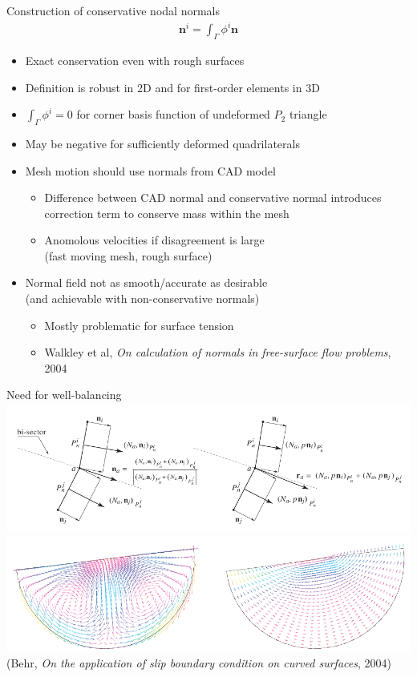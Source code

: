 \begin{frame}{Construction of conservative nodal normals}
  \begin{gather*}
    \bm n^i = \int_\Gamma \phi^i \bm n
  \end{gather*}
  \begin{itemize}
  \item Exact conservation even with rough surfaces
  \item Definition is robust in 2D and for first-order elements in 3D
  \item $\int_\Gamma \phi^i = 0$ for corner basis function of undeformed $P_2$ triangle
  \item May be negative for sufficiently deformed quadrilaterals
  \item Mesh motion should use normals from CAD model
    \begin{itemize}
    \item Difference between CAD normal and conservative normal introduces correction term to conserve mass within the mesh
\item Anomolous velocities if disagreement is large \\ (fast moving mesh, rough surface)
    \end{itemize}
  \item Normal field not as smooth/accurate as desirable \\ (and achievable with non-conservative normals)
    \begin{itemize}
    \item Mostly problematic for surface tension
    \item Walkley et al, \emph{On calculation of normals in free-surface flow problems}, 2004
    \end{itemize}
  \end{itemize}
\end{frame}

\begin{frame}{Need for well-balancing}
  \includegraphics[width=\textwidth]{figures/slip/Behr2004-NormalVsResidual} \\
  \includegraphics[width=\textwidth]{figures/slip/Behr2004-NavierSloshing} \\
  \footnotesize{(Behr, \emph{On the application of slip boundary condition on curved surfaces}, 2004)}
\end{frame}

